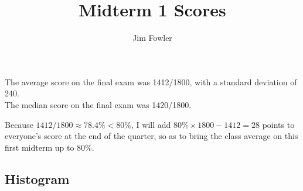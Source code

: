 \documentclass[11pt]{handout}
\title{Midterm 1 Scores}
\author{Jim Fowler}
\begin{document}
\maketitle


\noindent
The average score on the final exam was 1412/1800, with a standard deviation of 240. \\
The median score on the final exam was 1420/1800.

\vspace{1ex}\noindent%
Because $1412/1800 \approx 78.4\% < 80\%$, I will add 
$80\% \times 1800 - 1412 = 28$ points to everyone's score at the end of the quarter, so as to bring the class average on this first midterm up to 80\%.

\subsection*{Histogram}
\end{document}
